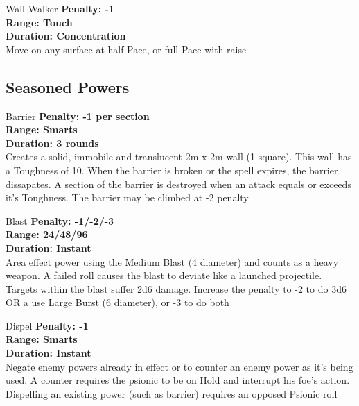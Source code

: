 \begin{multicols}{2}
\begin{genericsection}{Wall Walker}
\textbf{Penalty: -1}\\
\textbf{Range: Touch}\\
\textbf{Duration: Concentration}\\
Move on any surface at half Pace, or full Pace with raise
\end{genericsection}

\subsection{Seasoned Powers}

\begin{genericsection}{Barrier}
\textbf{Penalty: -1 per section}\\
\textbf{Range: Smarts}\\
\textbf{Duration: 3 rounds}\\
Creates a solid, immobile and translucent 2m x 2m wall (1 square). This wall has a Toughness of 10. When the barrier is broken or the spell expires, the barrier dissapates. A section of the barrier is destroyed when an attack equals or exceeds it's Toughness. The barrier may be climbed at -2 penalty
\end{genericsection}

\begin{genericsection}{Blast}
\textbf{Penalty: -1/-2/-3}\\
\textbf{Range: 24/48/96}\\
\textbf{Duration: Instant}\\
Area effect power using the Medium Blast (4 diameter) and counts as a heavy weapon. A failed roll causes the blast to deviate like a launched projectile. Targets within the blast suffer 2d6 damage. Increase the penalty to -2 to do 3d6 OR a use Large Burst (6 diameter), or -3 to do both
\end{genericsection}

\begin{genericsection}{Dispel}
\textbf{Penalty: -1}\\
\textbf{Range: Smarts}\\
\textbf{Duration: Instant}\\
Negate enemy powers already in effect or to counter an enemy power as it's being used. A counter requires the psionic to be on Hold and interrupt his foe's action. Dispelling an existing power (such as barrier) requires an opposed Psionic roll
\end{genericsection}


\end{multicols}
